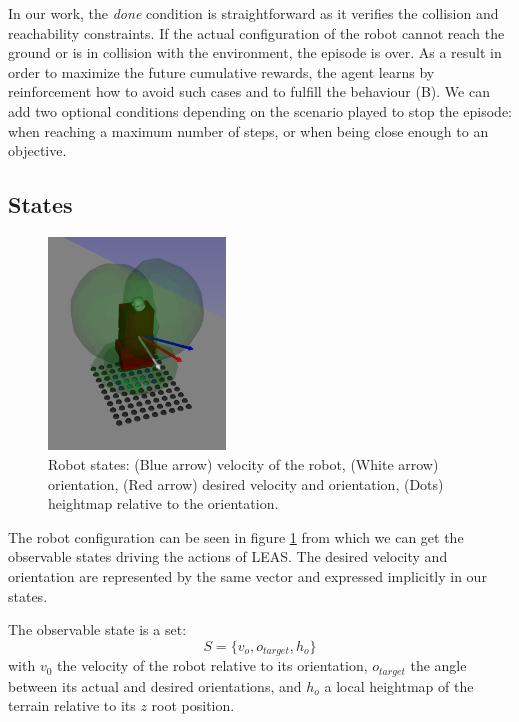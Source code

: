 In our work, the \textit{done} condition is straightforward as it verifies the collision and reachability constraints. If the actual configuration of the robot cannot reach the ground or is in collision with the environment, the episode is over. 
As a result in order to maximize the future cumulative rewards, the agent learns by reinforcement how to avoid such cases and to fulfill the behaviour (B). 
We can add two optional conditions depending on the scenario played to stop the episode: when reaching a maximum number of steps, or when being close enough to an objective.

\subsection{States\label{subsubsec:states}}

\begin{figure}
    \centering
    \includegraphics[width=0.42\textwidth]{Figures/Chapter_LEAS/leas_states.png}
    \caption{Robot states: (Blue arrow) velocity of the robot, (White arrow) orientation, (Red arrow) desired velocity and orientation, (Dots) heightmap relative to the orientation.}
    \label{fig:LEAS_states}
\end{figure}

The robot configuration can be seen in figure \ref{fig:LEAS_states} from which we can get the observable states driving the actions of LEAS. The desired velocity and orientation are represented by the same vector and expressed implicitly in our states.

The observable state is a set: 
\begin{equation}
S=\{v_{o}, o_{target}, h_{o}\}
\end{equation}
with $v_{0}$ the velocity of the robot relative to its orientation, $o_{target}$ the angle between its actual and desired orientations, and $h_{o}$ a local heightmap of the terrain relative to its $z$ root position.

